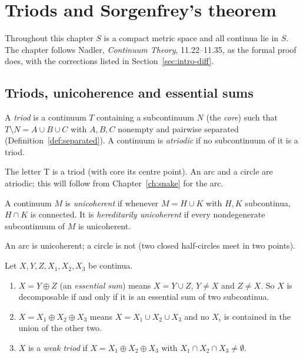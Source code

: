\chapter{Triods and Sorgenfrey's theorem}\label{ch:triods}

Throughout this chapter $S$ is a compact metric space and all continua lie in $S$. The chapter
follows Nadler, \emph{Continuum Theory}, 11.22--11.35, as the formal proof does, with the
corrections listed in Section~\ref{sec:intro-diff}.

\section{Triods, unicoherence and essential sums}

\begin{definition}\label{def:triod}
A \emph{triod} is a continuum $T$ containing a subcontinuum $N$ (the \emph{core}) such that
$T\setminus N=A\cup B\cup C$ with $A,B,C$ nonempty and pairwise separated
(Definition~\ref{def:separated}). A continuum is \emph{atriodic} if no subcontinuum of it is a
triod.
\end{definition}


The letter T is a triod (with core its centre point). An arc and a circle are atriodic; this will
follow from Chapter~\ref{ch:snake} for the arc.

\begin{definition}\label{def:unicoherent}
A continuum $M$ is \emph{unicoherent} if whenever $M=H\cup K$ with $H,K$ subcontinua, $H\cap K$ is
connected. It is \emph{hereditarily unicoherent} if every nondegenerate subcontinuum of $M$ is
unicoherent.
\end{definition}


An arc is unicoherent; a circle is not (two closed half-circles meet in two points).

\begin{definition}\label{def:esum}
Let $X,Y,Z,X_1,X_2,X_3$ be continua.
\begin{enumerate}[label=(\alph*)]
\item $X=Y\oplus Z$ (an \emph{essential sum}) means $X=Y\cup Z$, $Y\ne X$ and $Z\neq X$. So $X$ is
decomposable if and only if it is an essential sum of two subcontinua.
\item $X=X_1\oplus X_2\oplus X_3$ means $X=X_1\cup X_2\cup X_3$ and no $X_i$ is contained in the union
of the other two.
\item $X$ is a \emph{weak triod} if $X=X_1\oplus X_2\oplus X_3$ with $X_1\cap X_2\cap X_3\ne\emptyset$.
\end{enumerate}
\end{definition}

